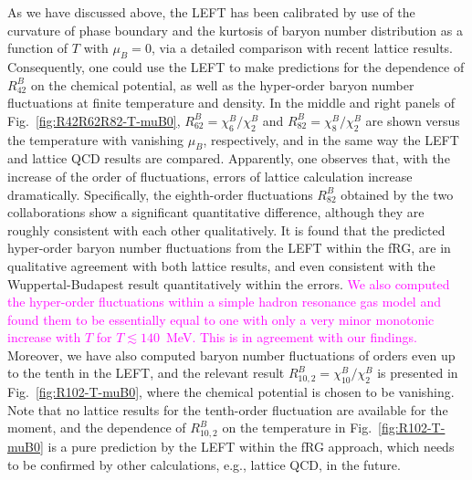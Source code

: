 \documentclass[%
reprint,
superscriptaddress,
showpacs,preprintnumbers,
 amsmath,amssymb,
 aps,
prd,
]{revtex4-1}
\def\Fig#1{Fig.~\ref{#1}} \def\Tab#1{Tab.~\ref{#1}}
\newcommand{\colfab}[1]{\textcolor{magenta}{#1}}
\begin{document}
As we have discussed above, the LEFT has been calibrated by use of the curvature of phase boundary and the kurtosis of baryon number distribution as a function of $T$ with $\mu_B=0$, via a detailed comparison with recent lattice results. Consequently, one could use the LEFT to make predictions for the dependence of $R^{B}_{42}$ on the chemical potential, as well as the hyper-order baryon number fluctuations at finite temperature and density. In the middle and right panels of \Fig{fig:R42R62R82-T-muB0}, $R^{B}_{62}=\chi^{B}_{6}/\chi^{B}_{2}$ and $R^{B}_{82}=\chi^{B}_{8}/\chi^{B}_{2}$ are shown versus the temperature with vanishing $\mu_B$, respectively, and in the same way the LEFT and lattice QCD results are compared. Apparently, one observes that, with the increase of the order of fluctuations, errors of lattice calculation increase dramatically. Specifically, the eighth-order fluctuations $R^{B}_{82}$ obtained by the two collaborations show a significant quantitative difference, although they are roughly consistent with each other qualitatively. It is found that the predicted hyper-order baryon number fluctuations from the LEFT within the fRG, are in qualitative agreement with both lattice results, and even consistent with the Wuppertal-Budapest result quantitatively within the errors.
\colfab{We also computed the hyper-order fluctuations within a simple hadron resonance gas model \cite{BraunMunzinger:2003zd} and found them to be essentially equal to one with only a very minor monotonic increase with $T$ for $T \lesssim 140$~MeV. This is in agreement with our findings.}
Moreover, we have also computed baryon number fluctuations of orders even up to the tenth in the LEFT, and the relevant result $R^{B}_{10,2}=\chi^{B}_{10}/\chi^{B}_{2}$ is presented in \Fig{fig:R102-T-muB0}, where the chemical potential is chosen to be vanishing. Note that no lattice results for the tenth-order fluctuation are available for the moment, and the dependence of $R^{B}_{10,2}$ on the temperature in \Fig{fig:R102-T-muB0} is a pure prediction by the LEFT within the fRG approach, which needs to be confirmed by other calculations, e.g., lattice QCD, in the future.
\end{document}
